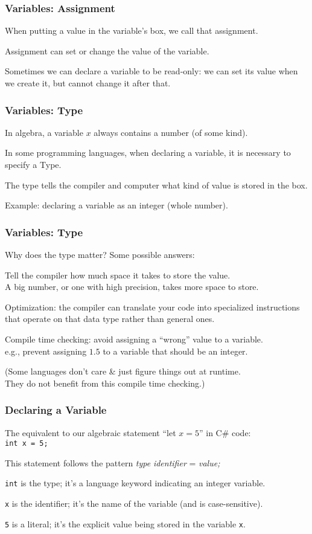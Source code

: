 \begin{frame}
\frametitle{Variables: Assignment}

When putting a value in the variable's box, we call that \alert{assignment}.

Assignment can set or change the value of the variable.

Sometimes we can declare a variable to be \alert{read-only}: we can set its value when we create it, but cannot change it after that.

\end{frame}

\begin{frame}
\frametitle{Variables: Type}

In algebra, a variable $x$ always contains a number (of some kind).

In some programming languages, when declaring a variable, it is necessary to specify a \alert{Type}.

The type tells the compiler and computer what kind of value is stored in the box.

Example: declaring a variable as an \alert{integer} (whole number).

\end{frame}

\begin{frame}
\frametitle{Variables: Type}

Why does the type matter? Some possible answers:

Tell the compiler how much space it takes to store the value.\\
\quad A big number, or one with high precision, takes more space to store.

Optimization: the compiler can translate your code into specialized instructions that operate on that data type rather than general ones.

Compile time checking: avoid assigning a ``wrong'' value to a variable.\\ \quad e.g., prevent assigning $1.5$ to a variable that should be an integer.

(Some languages don't care \& just figure things out at runtime. \\They do not benefit from this compile time checking.)

\end{frame}

\begin{frame}
\frametitle{Declaring a Variable}
The equivalent to our algebraic statement ``let $x = 5$'' in C\# code:\\
\quad \texttt{int x = 5;}

This statement follows the pattern \textit{type} \textit{identifier} = \textit{value;}

\texttt{int} is the type; it's a language keyword indicating an integer variable.

\texttt{x} is the identifier; it's the name of the variable (and is case-sensitive).

\texttt{5} is a literal; it's the explicit value being stored in the variable \texttt{x}.

\end{frame}


